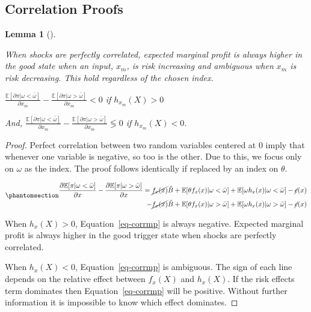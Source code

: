 \documentclass[
  letterpaper,
  DIV=11,
  numbers=noendperiod]{scrartcl}
\theoremstyle{plain}
\newtheorem{lemma}{Lemma}[section]
\theoremstyle{plain}
\theoremstyle{remark}
\begin{document}
\subsection{Correlation Proofs}\label{correlation-proofs}

\begin{lemma}[]\protect\hypertarget{lem-corr}{}\label{lem-corr}

When shocks are perfectly correlated, expected marginal profit is always
higher in the good state when an input, \(x_m\), is risk increasing and
ambiguous when \(x_m\) is risk decreasing. This hold regardless of the
chosen index.

\(\frac{\mathbb{E}[\partial \pi|\omega<\bar \omega]}{\partial x_m}-\frac{\mathbb{E}[\partial \pi|\omega>\bar \omega]}{\partial x_m}<0\)
if \(h_{x_m}(X)>0\)

And,
\(\frac{\mathbb{E}[\partial \pi|\omega<\bar \omega]}{\partial x_m}-\frac{\mathbb{E}[\partial \pi|\omega>\bar \omega]}{\partial x_m}\lessgtr 0\)
if \(h_{x_m}(X)<0\).

\end{lemma}

\begin{proof}
Perfect correlation between two random variables centered at 0 imply
that whenever one variable is negative, so too is the other. Due to
this, we focus only on \(\omega\) as the index. The proof follows
identically if replaced by an index on \(\theta\).

\begin{equation}\phantomsection\label{eq-corrmp}{
\begin{aligned}
\frac{\partial \mathbb{E}[\pi|\omega<\bar\omega]}{\partial x}-\frac{\partial \mathbb{E}[\pi|\omega>\bar\omega]}{\partial x}=\cancel{f_{x}(x)}\hat{B}+\mathbb{E}[\theta f_x(x)|\omega<\bar\omega]+\mathbb{E}[\omega h_{x}(x)|\omega<\bar\omega]-\cancel c(x)\\
-\cancel{f_{x}(x)}\hat{B}+\mathbb{E}[\theta f_x(x)|\omega>\bar\omega]+\mathbb{E}[\omega h_{x}(x)|\omega>\bar\omega]-\cancel c(x)
\end{aligned}
}\end{equation}

When \(h_x(X)>0\), Equation~\ref{eq-corrmp} is always negative. Expected
marginal profit is always higher in the good trigger state when shocks
are perfectly correlated.

When \(h_x(X)<0\), Equation~\ref{eq-corrmp} is ambiguous. The sign of
each line depends on the relative effect between \(f_x(X)\) and
\(h_x(X)\). If the risk effects term dominates then
Equation~\ref{eq-corrmp} will be positive. Without further information
it is impossible to know which effect dominates.
\end{proof}
\end{document}
